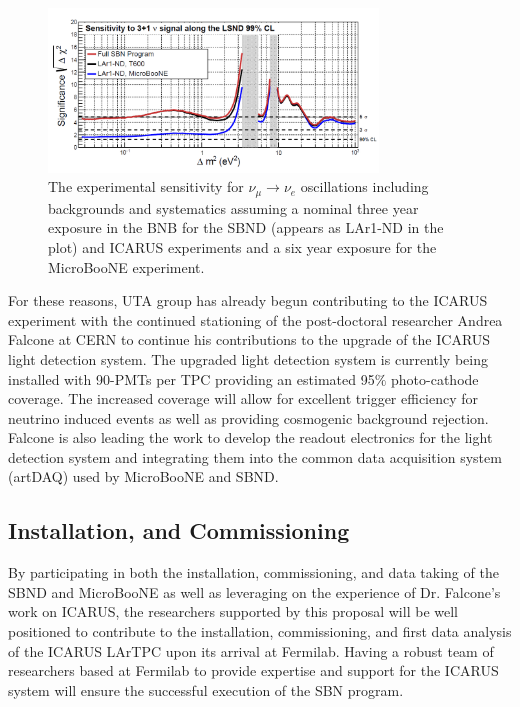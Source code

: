 \begin{figure}[htb]
\centering
\includegraphics[width=0.78\textwidth]{images/Sensitivity.png}
\caption[]{The experimental sensitivity for $\nu_{\mu} \rightarrow \nu_{e}$ oscillations including backgrounds and systematics assuming a nominal three year exposure in the BNB for the SBND (appears as LAr1-ND in the plot) and ICARUS experiments and a six year exposure for the MicroBooNE experiment.}
\label{fig:sense}
\end{figure}

For these reasons, UTA group has already begun contributing to the ICARUS experiment with the continued stationing of the post-doctoral researcher Andrea Falcone at CERN to continue his contributions to the upgrade of the ICARUS light detection system. The upgraded light detection system is currently being installed with 90-PMTs per TPC providing an estimated 95$\%$ photo-cathode coverage. The increased coverage will allow for excellent trigger efficiency for neutrino induced events as well as providing cosmogenic background rejection. Falcone is also leading the work to develop the readout electronics for the light detection system and integrating them into the common data acquisition system (artDAQ) used by MicroBooNE and SBND.

\subsection{Installation, and Commissioning}\label{sec:ICARUSBulid}
By participating in both the installation, commissioning, and data taking of the SBND and MicroBooNE as well as leveraging on the experience of Dr. Falcone's work on ICARUS, the researchers supported by this proposal will be well positioned to contribute to the installation, commissioning, and first data analysis of the ICARUS LArTPC upon its arrival at Fermilab. Having a robust team of researchers based at Fermilab to provide expertise and support for the ICARUS system will ensure the successful execution of the SBN program.


